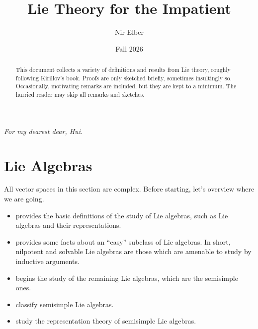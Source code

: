 \documentclass{article}
\title{Lie Theory for the Impatient}
\author{Nir Elber}
\date{Fall 2026}
\begin{document}
\maketitle

\begin{center}
	\textit{For my dearest dear, Hui.}
\end{center}

\begin{abstract}
	This document collects a variety of definitions and results from Lie theory, roughly following Kirillov's book. Proofs are only sketched briefly, sometimes insultingly so. Occasionally, motivating remarks are included, but they are kept to a minimum. The hurried reader may skip all remarks and sketches.
\end{abstract}

\tableofcontents

\newpage

\section{Lie Algebras} \label{sec:lie-alg}

All vector spaces in this section are complex. Before starting, let's overview where we are going.
\begin{itemize}
	\item {} provides the basic definitions of the study of Lie algebras, such as Lie algebras and their representations.
	\item {} provides some facts about an ``easy'' subclass of Lie algebras. In short, nilpotent and solvable Lie algebras are those which are amenable to study by inductive arguments.
	\item {} begins the study of the remaining Lie algebras, which are the semisimple ones.
	\item {} classify semisimple Lie algebras.
	\item {} study the representation theory of semisimple Lie algebras.
\end{itemize}
\end{document}

